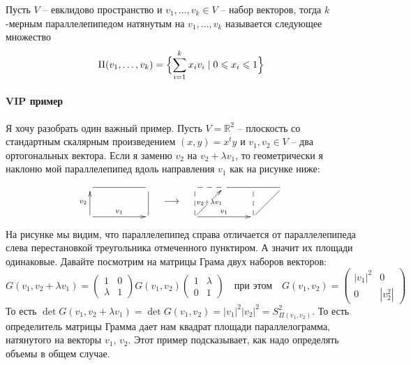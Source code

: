 \begin{definition}
Пусть $V$ -- евклидово пространство и $v_1,\ldots,v_k\in V$ -- набор векторов, тогда $k$-мерным параллелепипедом натянутым на $v_1,\ldots,v_k$ называется следующее множество
\[
\Pi(v_1,\ldots,v_k) = \Bigl\{\sum_{i=1}^k x_i v_i\mid 0\leqslant x_i \leqslant 1\Bigl\}
\]
\end{definition}

\paragraph{VIP пример}

Я хочу разобрать один важный пример.
Пусть $V = \mathbb R^2$ -- плоскость со стандартным скалярным произведением $(x, y) = x^t y$ и $v_1,v_2\in V$ -- два ортогональных вектора.
Если я заменю $v_2$ на $v_2 + \lambda v_1$, то геометрически я наклоню мой параллелепипед вдоль направления $v_1$ как на рисунке ниже:
\[
\begin{aligned}
\xymatrix{
	{}\ar@{-}[rr]&{}&{}\\
	{}\ar[u]^{v_2}\ar[rr]^{v_1}&{}&{}\ar@{-}[u]\\
}
\end{aligned}
\quad\longrightarrow\quad
\begin{aligned}
\xymatrix{
	{}\ar@{--}[r]&{}\ar@{-}[rr]&{}&{}\\
	{}\ar@{--}[u]\ar[rr]^{v_1}\ar[ru]|{v_2 + \lambda v_1}&{}&{}\ar@{--}[u]\ar@{-}[ru]&{}\\
}
\end{aligned}
\]
На рисунке мы видим, что параллелепипед справа отличается от параллелепипеда слева перестановкой треугольника отмеченного пунктиром.
А значит их площади одинаковые.
Давайте посмотрим на матрицы Грама двух наборов векторов:
\[
G(v_1, v_2 + \lambda v_1) = 
\begin{pmatrix}
{1}&{0}\\
{\lambda}&{1}
\end{pmatrix}
G(v_1,v_2)
\begin{pmatrix}
{1}&{\lambda}\\
{0}&{1}
\end{pmatrix}
\quad\text{при этом}\quad
G(v_1,v_2) =
\begin{pmatrix}
{|v_1|^2}&{0}\\
{0}&{|v_2^2|}
\end{pmatrix}
\]
То есть $\det G(v_1,v_2 + \lambda v_1) = \det G(v_1,v_2) = |v_1|^2 |v_2|^2 = S_{\Pi(v_1,v_2)}^2$.
То есть определитель матрицы Грамма дает нам квадрат площади параллелограмма, натянутого на векторы $v_1$, $v_2$.
Этот пример подсказывает, как надо определять объемы в общем случае.

